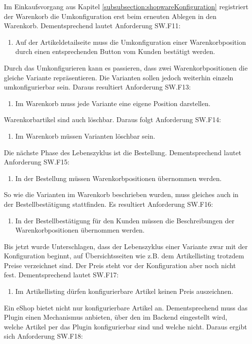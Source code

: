 \documentclass[12pt,a4paper,bibliography=totocnumbered,listof=totoc]{scrartcl}
\begin{document}
Im Einkaufsvorgang aus Kapitel \ref{subsubsection:shopwareKonfiguration} registriert der Warenkorb die Umkonfiguration erst beim erneuten Ablegen in den Warenkorb. Dementsprechend lautet Anforderung SW.F11:
\begin{enumerate}[SW.F11:]\bfseries
\item Auf der Artikeldetailseite muss die Umkonfiguration einer Warenkorbposition durch einen entsprechenden Button vom Kunden bestätigt werden.
\end{enumerate}
Durch das Umkonfigurieren kann es passieren, dass zwei Warenkorbpositionen die gleiche Variante repräsentieren. Die Varianten sollen jedoch weiterhin einzeln umkonfigurierbar sein. Daraus resultiert Anforderung SW.F13:
\begin{enumerate}[SW.F13:]\bfseries
\item Im Warenkorb muss jede Variante eine eigene Position darstellen.
\end{enumerate}
Warenkorbartikel sind auch löschbar. Daraus folgt Anforderung SW.F14:
\begin{enumerate}[SW.F14:]\bfseries
\item Im Warenkorb müssen Varianten löschbar sein.
\end{enumerate}
Die nächste Phase des Lebenszyklus ist die Bestellung. Dementsprechend lautet Anforderung SW.F15:
\begin{enumerate}[SW.F15:]\bfseries
\item In der Bestellung müssen Warenkorbpositionen übernommen werden.
\end{enumerate}
So wie die Varianten im Warenkorb beschrieben wurden, muss gleiches auch in der Bestellbestätigung stattfinden. Es resultiert Anforderung SW.F16:
\begin{enumerate}[SW.F16:]\bfseries
\item In der Bestellbestätigung für den Kunden müssen die Beschreibungen der Warenkorbpositionen übernommen werden.
\end{enumerate}
Bis jetzt wurde Unterschlagen, dass der Lebenszyklus einer Variante zwar mit der Konfiguration beginnt, auf Übersichtsseiten wie z.B. dem Artikellisting trotzdem Preise verzeichnet sind. Der Preis steht vor der Konfiguration aber noch nicht fest. Dementsprechend lautet SW.F17:
\begin{enumerate}[SW.F17:]\bfseries
\item Im Artikellisting dürfen konfigurierbare Artikel keinen Preis auszeichnen.
\end{enumerate}
Ein eShop bietet nicht nur konfigurierbare Artikel an. Dementsprechend muss das Plugin einen Mechanismus anbieten, über den im Backend eingestellt wird, welche Artikel per das Plugin konfigurierbar sind und welche nicht. Daraus ergibt sich Anforderung SW.F18:
\end{document}

